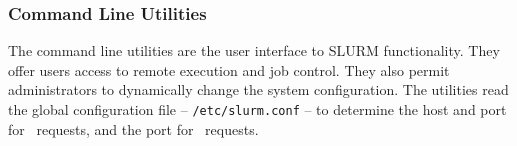 \begin{itemize}

\end{itemize}

\subsubsection{Command Line Utilities}

The command line utilities are the user interface to SLURM functionality.
They offer users access to remote execution and job control. They also 
permit administrators to dynamically change the system configuration. The 
utilities read the global configuration file -- {\tt /etc/slurm.conf} --
to determine the host and port for \slurmctld\ requests, and the port
for \slurmd\ requests. 

